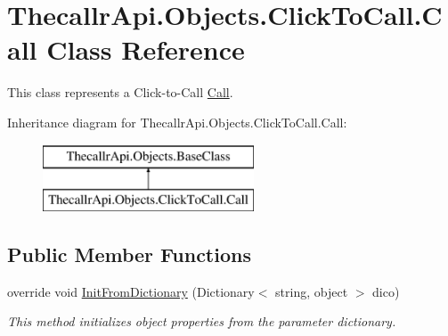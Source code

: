 \hypertarget{class_thecallr_api_1_1_objects_1_1_click_to_call_1_1_call}{\section{Thecallr\+Api.\+Objects.\+Click\+To\+Call.\+Call Class Reference}
\label{class_thecallr_api_1_1_objects_1_1_click_to_call_1_1_call}
}


This class represents a Click-\/to-\/\+Call \hyperlink{class_thecallr_api_1_1_objects_1_1_click_to_call_1_1_call}{Call}.  


Inheritance diagram for Thecallr\+Api.\+Objects.\+Click\+To\+Call.\+Call\+:\begin{figure}[H]
\begin{center}
\leavevmode
\includegraphics[height=2.000000cm]{class_thecallr_api_1_1_objects_1_1_click_to_call_1_1_call}
\end{center}
\end{figure}
\subsection*{Public Member Functions}
\begin{DoxyCompactItemize}
\item 
override void \hyperlink{class_thecallr_api_1_1_objects_1_1_click_to_call_1_1_call_a43d743a09581bded6e337c312400fede}{Init\+From\+Dictionary} (Dictionary$<$ string, object $>$ dico)
\begin{DoxyCompactList}\small\item\em This method initializes object properties from the parameter dictionary. \end{DoxyCompactList}\end{DoxyCompactItemize}
